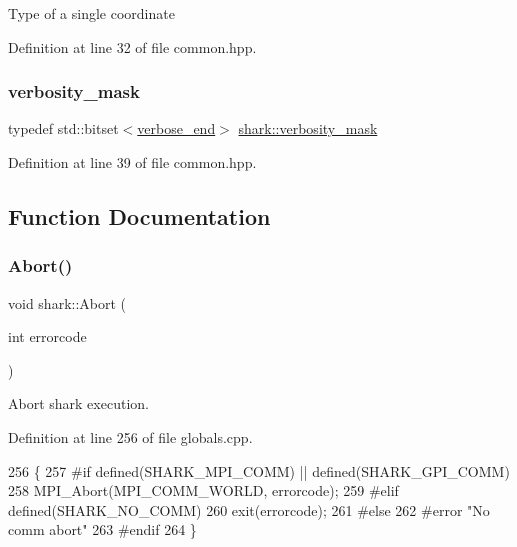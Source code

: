 Type of a single coordinate 

Definition at line 32 of file common.\+hpp.

\hypertarget{namespaceshark_a882c3e22f3e4476cf4a95f34a42e27eb}{}\label{namespaceshark_a882c3e22f3e4476cf4a95f34a42e27eb} 
\subsubsection{\texorpdfstring{verbosity\+\_\+mask}{verbosity\_mask}}
{\footnotesize\ttfamily typedef std\+::bitset$<$\hyperlink{namespaceshark_a0603d8d658beed6e7e3fc44471f5c04f}{verbose\+\_\+end}$>$ \hyperlink{namespaceshark_a882c3e22f3e4476cf4a95f34a42e27eb}{shark\+::verbosity\+\_\+mask}}



Definition at line 39 of file common.\+hpp.



\subsection{Function Documentation}
\hypertarget{namespaceshark_a6a162c31c594f35cb696d65d231e1b5c}{}\label{namespaceshark_a6a162c31c594f35cb696d65d231e1b5c} 
\subsubsection{\texorpdfstring{Abort()}{Abort()}}
{\footnotesize\ttfamily void shark\+::\+Abort (\begin{DoxyParamCaption}\item[{int}]{errorcode }\end{DoxyParamCaption})}

Abort shark execution. 

Definition at line 256 of file globals.\+cpp.


\begin{DoxyCode}
256                                \{
257 \textcolor{preprocessor}{#if defined(SHARK\_MPI\_COMM) || defined(SHARK\_GPI\_COMM)}
258     MPI\_Abort(MPI\_COMM\_WORLD, errorcode);
259 \textcolor{preprocessor}{#elif defined(SHARK\_NO\_COMM)}
260     exit(errorcode);
261 \textcolor{preprocessor}{#else}
262 \textcolor{preprocessor}{#error "No comm abort"}
263 \textcolor{preprocessor}{#endif}
264 \}
\end{DoxyCode}
\hypertarget{namespaceshark_a01c919545e5586af9484f058f38774b6}{}\label{namespaceshark_a01c919545e5586af9484f058f38774b6} 
